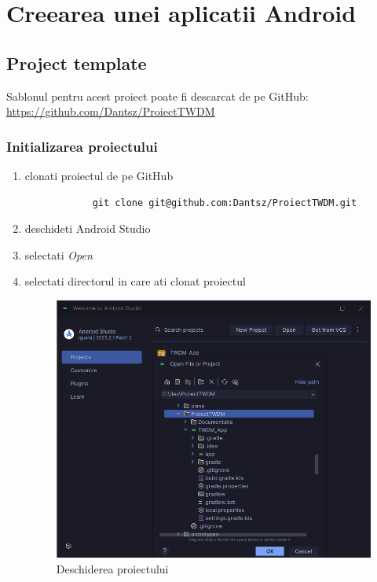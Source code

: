 \section{Creearea unei aplicatii Android}
\subsection{Project template}
Sablonul pentru acest proiect poate fi descarcat de pe GitHub: \url{https://github.com/Dantsz/ProiectTWDM}
\subsubsection{Initializarea proiectului}
\begin{enumerate}
    \item clonati proiectul de pe GitHub
          \begin{lstlisting}
            git clone git@github.com:Dantsz/ProiectTWDM.git
        \end{lstlisting}
    \item deschideti Android Studio
    \item selectati \textit{Open}
    \item selectati directorul in care ati clonat proiectul
          \begin{figure}[H]
              \centering
              \includegraphics[width=0.7\linewidth]{figs/open_project.png}
              \caption{Deschiderea proiectului}
              \label{fig:open_project}
          \end{figure}
\end{enumerate}